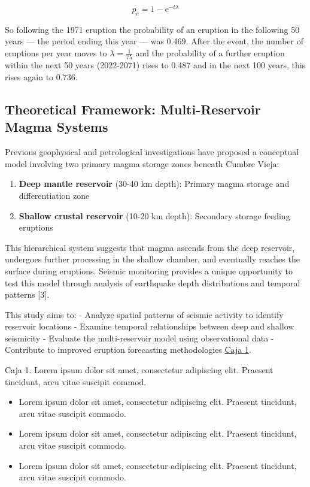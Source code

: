 \documentclass[
  spanish,
  letterpaper,
]{book}
\providecommand{\tightlist}{%
  \setlength{\itemsep}{0pt}\setlength{\parskip}{0pt}}
\begin{document}
\[
p_e = 1-\mathrm{e}^{-t \lambda}
\]

So following the 1971 eruption the probability of an eruption in the
following 50 years --- the period ending this year --- was 0.469. After
the event, the number of eruptions per year moves to
\(\lambda=\frac{1}{75}\) and the probability of a further eruption
within the next 50 years (2022-2071) rises to 0.487 and in the next 100
years, this rises again to 0.736.

\subsection{Theoretical Framework: Multi-Reservoir Magma
Systems}\label{theoretical-framework-multi-reservoir-magma-systems}

Previous geophysical and petrological investigations have proposed a
conceptual model involving two primary magma storage zones beneath
Cumbre Vieja:

\begin{enumerate}
\def\labelenumi{\arabic{enumi}.}
\tightlist
\item
  \textbf{Deep mantle reservoir} (30-40 km depth): Primary magma storage
  and differentiation zone
\item
  \textbf{Shallow crustal reservoir} (10-20 km depth): Secondary storage
  feeding eruptions
\end{enumerate}

This hierarchical system suggests that magma ascends from the deep
reservoir, undergoes further processing in the shallow chamber, and
eventually reaches the surface during eruptions. Seismic monitoring
provides a unique opportunity to test this model through analysis of
earthquake depth distributions and temporal patterns {[}3{]}.

This study aims to: - Analyze spatial patterns of seismic activity to
identify reservoir locations - Examine temporal relationships between
deep and shallow seismicity - Evaluate the multi-reservoir model using
observational data - Contribute to improved eruption forecasting
methodologies \hyperref[box1]{Caja 1}.

\begin{tcolorbox}[enhanced jigsaw, colframe=quarto-callout-important-color-frame, rightrule=.15mm, toprule=.15mm, arc=.35mm, opacityback=0, leftrule=.75mm, breakable, left=2mm, bottomrule=.15mm, colback=white]

Caja 1. Lorem ipsum dolor sit amet, consectetur adipiscing elit.
Praesent tincidunt, arcu vitae suscipit commod.

\begin{itemize}
\tightlist
\item
  Lorem ipsum dolor sit amet, consectetur adipiscing elit. Praesent
  tincidunt, arcu vitae suscipit commodo.
\item
  Lorem ipsum dolor sit amet, consectetur adipiscing elit. Praesent
  tincidunt, arcu vitae suscipit commodo.
\item
  Lorem ipsum dolor sit amet, consectetur adipiscing elit. Praesent
  tincidunt, arcu vitae suscipit commodo.
\end{itemize}

\end{tcolorbox}
\end{document}
